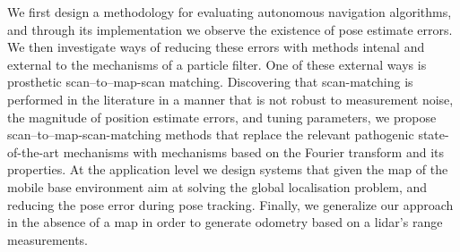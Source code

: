 We first design a methodology for evaluating autonomous navigation algorithms,
and through its implementation we observe the existence of pose estimate
errors. We then investigate ways of reducing these errors with methods intenal
and external to the mechanisms of a particle filter. One of these external ways
is prosthetic scan--to--map-scan matching. Discovering that scan-matching is
performed in the literature in a manner that is not robust to measurement
noise, the magnitude of position estimate errors, and tuning parameters, we
propose scan--to--map-scan-matching methods that replace the relevant
pathogenic state-of-the-art mechanisms with mechanisms based on the Fourier
transform and its properties. At the application level we design systems that
given the map of the mobile base environment aim at solving the global
localisation problem, and reducing the pose error during pose tracking.
Finally, we generalize our approach in the absence of a map in order to
generate odometry based on a lidar's range measurements.


\restoregeometry
\doublespace
